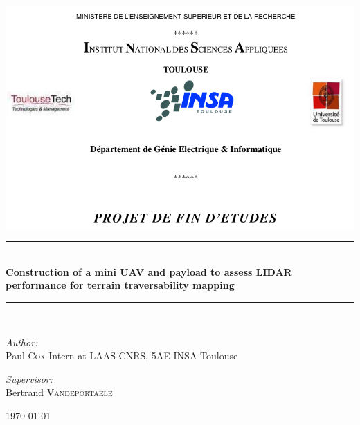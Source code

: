 \documentclass[a4paper,11pt]{report}
\newcommand{\HRule}{\rule{\linewidth}{0.5mm}}
\begin{document}
\begin{titlepage}

\begin{center}

\includegraphics[width=18cm]{title_top.png}

\HRule \\[0.4cm]
{ \huge \bfseries Construction of a mini UAV and payload to assess LIDAR performance for terrain traversability mapping}\\[0.4cm]

\HRule \\[1.5cm]

\begin{minipage}{0.4\textwidth}
\begin{flushleft} \large
\emph{Author:}\\
Paul \textsc{Cox} Intern at LAAS-CNRS, 5AE INSA Toulouse
\end{flushleft}
\end{minipage}
\begin{minipage}{0.4\textwidth}
\begin{flushright} \large
\emph{Supervisor:} \\
Bertrand \textsc{Vandeportaele}
\end{flushright}
\end{minipage}

\vfill
{\large \today}

\end{center}
\end{titlepage}

\tableofcontents
\newpage
\end{document}
